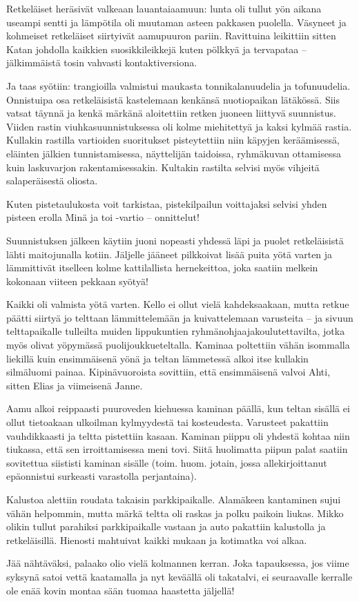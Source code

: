 \begin{multicols}{2}
	Retkeläiset heräsivät valkeaan lauantaiaamuun: lunta oli tullut yön
	aikana useampi sentti ja lämpötila oli muutaman asteen pakkasen
	puolella. Väsyneet ja kohmeiset retkeläiset siirtyivät aamupuuron
	pariin. Ravittuina leikittiin sitten Katan johdolla kaikkien
	suosikkileikkejä kuten pölkkyä ja tervapataa – jälkimmäistä tosin
	vahvasti kontaktiversiona. 

	Ja taas syötiin: trangioilla valmistui maukasta tonnikalanuudelia ja
	tofunuudelia. Onnistuipa osa retkeläisistä kastelemaan kenkänsä
	nuotiopaikan lätäkössä. Siis vatsat täynnä ja kenkä märkänä aloitettiin
	retken juoneen liittyvä suunnistus. Viiden rastin viuhkasuunnistuksessa
	oli kolme miehitettyä ja kaksi kylmää rastia. Kullakin rastilla
	vartioiden suoritukset pisteytettiin niin käpyjen keräämisessä,
	eläinten jälkien tunnistamisessa, näyttelijän taidoissa, ryhmäkuvan
	ottamisessa kuin laskuvarjon rakentamisessakin. Kultakin rastilta
	selvisi myös vihjeitä salaperäisestä oliosta. 

	Kuten pistetaulukosta voit tarkistaa, pistekilpailun voittajaksi
	selvisi yhden pisteen erolla Minä ja toi -vartio – onnittelut!

	Suunnistuksen jälkeen käytiin juoni nopeasti yhdessä läpi ja puolet
	retkeläisistä lähti maitojunalla kotiin. Jäljelle jääneet pilkkoivat
	lisää puita yötä varten ja lämmittivät itselleen kolme kattilallista
	hernekeittoa, joka saatiin melkein kokonaan viiteen pekkaan syötyä!

	Kaikki oli valmista yötä varten. Kello ei ollut vielä kahdeksaakaan,
	mutta retkue päätti siirtyä jo telttaan lämmittelemään ja
	kuivattelemaan varusteita – ja sivuun telttapaikalle tulleilta muiden
	lippukuntien ryhmänohjaajakoulutettavilta, jotka myös olivat yöpymässä
	puolijoukkueteltalla. Kaminaa poltettiin vähän isommalla liekillä kuin
	ensimmäisenä yönä ja teltan lämmetessä alkoi itse kullakin silmäluomi
	painaa. Kipinävuoroista sovittiin, että ensimmäisenä valvoi Ahti,
	sitten Elias ja viimeisenä Janne. 

	Aamu alkoi reippaasti puuroveden kiehuessa kaminan päällä, kun teltan
	sisällä ei ollut tietoakaan ulkoilman kylmyydestä tai kosteudesta.
	Varusteet pakattiin vauhdikkaasti ja teltta pistettiin kasaan. Kaminan
	piippu oli yhdestä kohtaa niin tiukassa, että sen irroittamisessa meni
	tovi. Siitä huolimatta piipun palat saatiin sovitettua siististi
	kaminan sisälle (toim. huom. jotain, jossa allekirjoittanut epäonnistui
	surkeasti varastolla perjantaina).

	Kalustoa alettiin roudata takaisin parkkipaikalle. Alamäkeen kantaminen
	sujui vähän helpommin, mutta märkä teltta oli raskas ja polku paikoin
	liukas. Mikko olikin tullut parahiksi parkkipaikalle vastaan ja auto
	pakattiin kalustolla ja retkeläisillä. Hienosti mahtuivat kaikki mukaan
	ja kotimatka voi alkaa.

	Jää nähtäväksi, palaako olio vielä kolmannen kerran. Joka tapauksessa,
	jos viime syksynä satoi vettä kaatamalla ja nyt keväällä oli takatalvi,
	ei seuraavalle kerralle ole enää kovin montaa sään tuomaa haastetta
	jäljellä!

\end{multicols}

